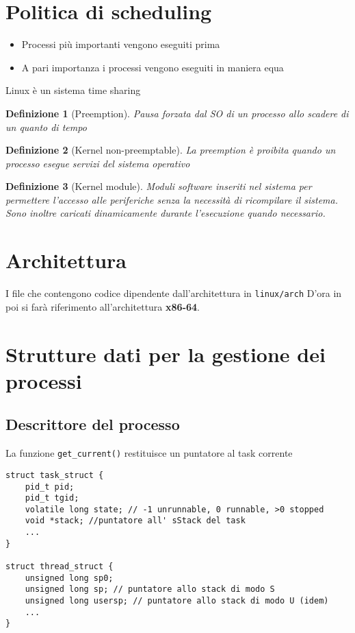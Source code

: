 \documentclass[12pt, a4paper]{report}
\newtheorem{definition}{Definizione}
\begin{document}
\section{Politica di scheduling}
\begin{itemize}
	\item Processi più importanti vengono eseguiti prima
	\item A pari importanza i processi vengono eseguiti in maniera equa
\end{itemize}
Linux è un sistema time sharing
\begin{definition}[Preemption]
	Pausa forzata dal SO di un processo allo scadere di un quanto di tempo
\end{definition}
\begin{definition}[Kernel non-preemptable]
	La preemption è proibita quando un processo esegue servizi del sistema
	operativo
\end{definition}
\begin{definition}[Kernel module]
	Moduli software inseriti nel sistema per permettere l'accesso alle
	periferiche senza la necessità di ricompilare il sistema. Sono inoltre
	caricati dinamicamente durante l'esecuzione quando necessario.
\end{definition}
\section{Architettura}
I file che contengono codice dipendente dall'architettura in \texttt{linux/arch}
D'ora in poi si farà riferimento all'architettura \textbf{x86-64}.
\section{Strutture dati per la gestione dei processi}
\subsection{Descrittore del processo}
La funzione \texttt{get\_current()} restituisce un puntatore al task corrente
\begin{verbatim}
struct task_struct {
    pid_t pid;
    pid_t tgid;
    volatile long state; // ‐1 unrunnable, 0 runnable, >0 stopped
    void *stack; //puntatore all' sStack del task
    ...
}

struct thread_struct {
    unsigned long sp0;
    unsigned long sp; // puntatore allo stack di modo S
    unsigned long usersp; // puntatore allo stack di modo U (idem)
    ...
}
\end{verbatim}
\end{document}
